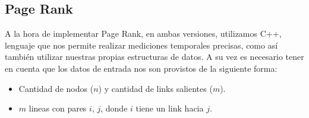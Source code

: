 \subsection{Page Rank}

A la hora de implementar Page Rank, en ambas versiones, utilizamos \textsc{C++}, lenguaje que nos permite realizar mediciones temporales precisas, como así también utilizar nuestras propias estructuras de datos.
A su vez es necesario tener en cuenta que los datos de entrada nos son provistos de la siguiente forma:
\begin{itemize}
	\item Cantidad de nodos ($n$) y cantidad de links salientes ($m$).
	\item $m$ lineas con pares $i$, $j$, donde $i$ tiene un link hacia $j$.
\end{itemize}

